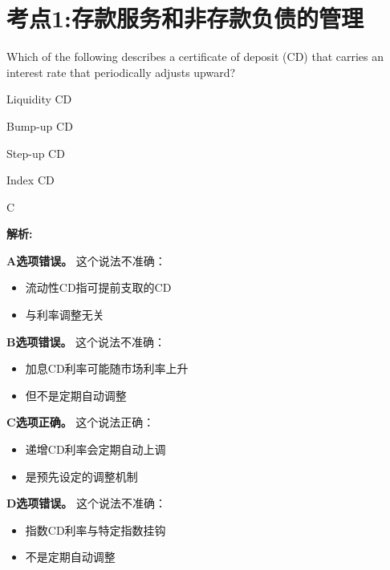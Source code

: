 \documentclass{article}
\newcounter{question} %
\newenvironment{explanation}
{\textbf{解析:}\par}
{\par}
\begin{document}
 \tableofcontents %
\newpage




\section{考点1:存款服务和非存款负债的管理}
\setcounter{question}{0}


\begin{question}
    Which of the following describes a certificate of deposit (CD) that carries an interest rate that periodically adjusts upward?
\end{question}

\begin{choices}
    \item Liquidity CD
    \item Bump-up CD
    \item Step-up CD
    \item Index CD
\end{choices}

\begin{correctanswer}
    C
\end{correctanswer}

\begin{explanation}
    \textbf{A选项错误。}
    这个说法不准确：
    \begin{itemize}
        \item 流动性CD指可提前支取的CD
        \item 与利率调整无关
    \end{itemize}

    \textbf{B选项错误。}
    这个说法不准确：
    \begin{itemize}
        \item 加息CD利率可能随市场利率上升
        \item 但不是定期自动调整
    \end{itemize}

    \textbf{C选项正确。}
    这个说法正确：
    \begin{itemize}
        \item 递增CD利率会定期自动上调
        \item 是预先设定的调整机制
    \end{itemize}

    \textbf{D选项错误。}
    这个说法不准确：
    \begin{itemize}
        \item 指数CD利率与特定指数挂钩
        \item 不是定期自动调整
    \end{itemize}
\end{explanation}
\end{document}
